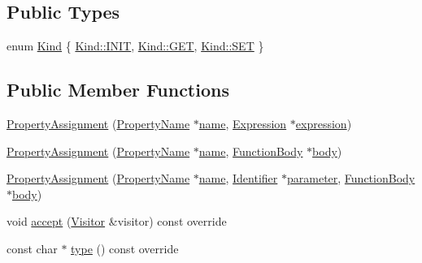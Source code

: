 \subsection*{Public Types}
\begin{DoxyCompactItemize}
\item 
enum \hyperlink{struct_property_assignment_a123a67b3e1b5d04a4a34b8d528e9fc96}{Kind} \{ \hyperlink{struct_property_assignment_a123a67b3e1b5d04a4a34b8d528e9fc96afaee4ca3c30ee18148ce3ada37466498}{Kind\+::\+I\+N\+IT}, 
\hyperlink{struct_property_assignment_a123a67b3e1b5d04a4a34b8d528e9fc96a7528035a93ee69cedb1dbddb2f0bfcc8}{Kind\+::\+G\+ET}, 
\hyperlink{struct_property_assignment_a123a67b3e1b5d04a4a34b8d528e9fc96a8c52684db8f49511e9b44471716bf164}{Kind\+::\+S\+ET}
 \}
\end{DoxyCompactItemize}
\subsection*{Public Member Functions}
\begin{DoxyCompactItemize}
\item 
\hyperlink{struct_property_assignment_a64236ec1cf776e15b81b31ebf7f0b861}{Property\+Assignment} (\hyperlink{struct_property_name}{Property\+Name} $\ast$\hyperlink{struct_property_assignment_a5e0dc6f37850bd4ae74b811f6548e376}{name}, \hyperlink{struct_expression}{Expression} $\ast$\hyperlink{struct_property_assignment_addee7ee5b0743c84303d1f3fad4a8a38}{expression})
\item 
\hyperlink{struct_property_assignment_a8c30ce94f94bf2372e424884b625e2eb}{Property\+Assignment} (\hyperlink{struct_property_name}{Property\+Name} $\ast$\hyperlink{struct_property_assignment_a5e0dc6f37850bd4ae74b811f6548e376}{name}, \hyperlink{struct_function_body}{Function\+Body} $\ast$\hyperlink{struct_property_assignment_a8e2a28f8fa96db3a64a91adad7a64ca1}{body})
\item 
\hyperlink{struct_property_assignment_ac53a5f23349fc6e50902b8704e827410}{Property\+Assignment} (\hyperlink{struct_property_name}{Property\+Name} $\ast$\hyperlink{struct_property_assignment_a5e0dc6f37850bd4ae74b811f6548e376}{name}, \hyperlink{struct_identifier}{Identifier} $\ast$\hyperlink{struct_property_assignment_a1f28fd75fe300211ee934a65d33650bc}{parameter}, \hyperlink{struct_function_body}{Function\+Body} $\ast$\hyperlink{struct_property_assignment_a8e2a28f8fa96db3a64a91adad7a64ca1}{body})
\item 
void \hyperlink{struct_property_assignment_aaf11e7373f4d7863802c51548ce22317}{accept} (\hyperlink{struct_visitor}{Visitor} \&visitor) const override
\item 
const char $\ast$ \hyperlink{struct_property_assignment_a77265e467948282cbfe2ff5c60ccf6da}{type} () const override
\end{DoxyCompactItemize}
